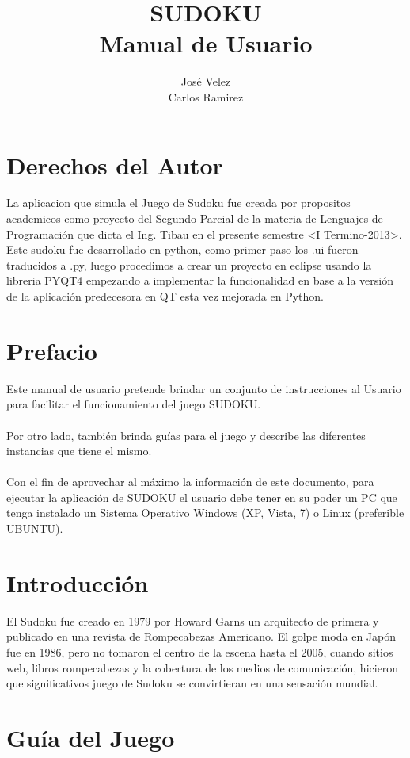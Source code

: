 \documentclass[12pt,oneside]{book}
\title{SUDOKU \\ Manual de Usuario}
\author{José Velez \\ Carlos Ramirez}
\begin{document}
\maketitle
\tableofcontents


\chapter{Derechos del Autor}
La aplicacion que simula el Juego de Sudoku fue creada por propositos academicos como proyecto del Segundo Parcial de la materia de Lenguajes de Programación que dicta el Ing. Tibau en el presente semestre <I Termino-2013>. Este sudoku fue desarrollado en python, como primer paso los .ui fueron traducidos a .py, luego procedimos a crear un proyecto en eclipse usando la libreria PYQT4 empezando a implementar la funcionalidad en base a la versión de la aplicación predecesora en QT esta vez mejorada en Python.


\chapter{Prefacio}

Este manual de usuario pretende brindar un conjunto de instrucciones al Usuario para facilitar el funcionamiento del juego SUDOKU. \ \\ \\ 
Por otro lado, también brinda guías para el juego y describe las diferentes instancias que tiene el mismo. \ \\ \\
Con el fin de aprovechar al máximo la información de este documento, para ejecutar la aplicación de SUDOKU el usuario debe tener en su poder un PC que tenga instalado un Sistema Operativo Windows (XP, Vista, 7) o Linux (preferible UBUNTU).


\chapter{Introducción}

El Sudoku  fue creado en 1979 por Howard Garns un arquitecto de primera y publicado en una revista de Rompecabezas Americano. El golpe moda en Japón fue en 1986, pero no tomaron el centro de la escena hasta el 2005, cuando sitios web, libros rompecabezas y la cobertura de los medios de comunicación, hicieron que  significativos juego de Sudoku se convirtieran en una sensación mundial.



\chapter{Guía del Juego}
\end{document}

